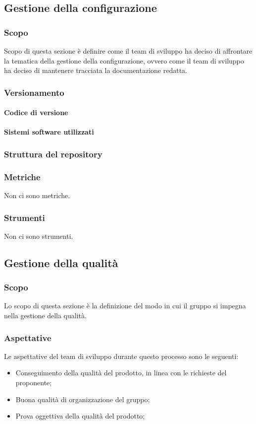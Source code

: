 \subsection{Gestione della configurazione}\label{subsection:gestione_configurazione}
\subsubsection{Scopo}
Scopo di questa sezione è definire come il team di sviluppo ha deciso di affrontare la tematica della gestione della configurazione, ovvero come il team di sviluppo ha deciso di mantenere tracciata la documentazione redatta.
\subsubsection{Versionamento}
\paragraph{Codice di versione}
\paragraph{Sistemi software utilizzati}
\subsubsection{Struttura del repository}
\subsubsection{Metriche}
Non ci sono metriche.
\subsubsection{Strumenti}
Non ci sono strumenti.




\subsection{Gestione della qualità}\label{subsection: gestione_qualita}
\subsubsection{Scopo}
Lo scopo di questa sezione è la definizione del modo in cui il gruppo si impegna nella gestione della qualità.
\subsubsection{Aspettative}
Le aspettative del team di sviluppo durante questo processo sono le seguenti:
\begin {itemize}
    \item Conseguimento della qualità del prodotto, in linea con le richieste del proponente;
    \item Buona qualità di organizzazione del gruppo;
    \item Prova oggettiva della qualità del prodotto;
\end {itemize}
